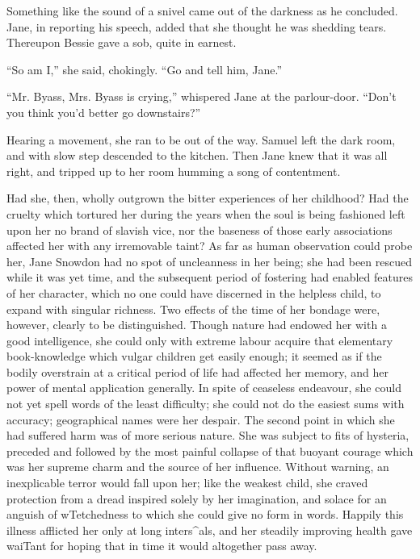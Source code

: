 Something like the sound of a snivel came out of the darkness as he
concluded. Jane, in reporting his speech, added that she thought he was
shedding tears. Thereupon Bessie gave a sob, quite in earnest.

``So am I,'' she said, chokingly. ``Go and tell him, Jane.''

``Mr. Byass, Mrs. Byass is crying,'' whispered Jane at the parlour-door.
``Don't you think you'd better go downstairs?''

Hearing a movement, she ran to be out of the way. Samuel left the dark
room, and with slow step descended to the kitchen. Then Jane knew that
it was all right, and {\protect\hypertarget{39}{}{}}tripped up to her
room humming a song of contentment.

Had she, then, wholly outgrown the bitter experiences of her childhood?
Had the cruelty which tortured her during the years when the soul is
being fashioned left upon her no brand of slavish vice, nor the baseness
of those early associations affected her with any irremovable taint? As
far as human observation could probe her, Jane Snowdon had no spot of
uncleanness in her being; she had been rescued while it was yet time,
and the subsequent period of fostering had enabled features of her
character, which no one could have discerned in the helpless child, to
expand with singular richness. Two effects of the time of her bondage
were, however, clearly to be distinguished. Though nature had endowed
her with a good intelligence, she could only with extreme labour acquire
that elementary book-knowledge which vulgar children get easily enough;
it seemed as if the bodily overstrain at a critical period of life had
affected her memory, and her power of mental application
{\protect\hypertarget{40}{}{}}generally. In spite of ceaseless
endeavour, she could not yet spell words of the least difficulty; she
could not do the easiest sums with accuracy; geographical names were her
despair. The second point in which she had suffered harm was of more
serious nature. She was subject to fits of hysteria, preceded and
followed by the most painful collapse of that buoyant courage which was
her supreme charm and the source of her influence. Without warning, an
inexplicable terror would fall upon her; like the weakest child, she
craved protection from a dread inspired solely by her imagination, and
solace for an anguish of wTetchedness to which she could give no form in
words. Happily this illness afflicted her only at long inters\^{}als,
and her steadily improving health gave waiTant for hoping that in time
it would altogether pass away.

